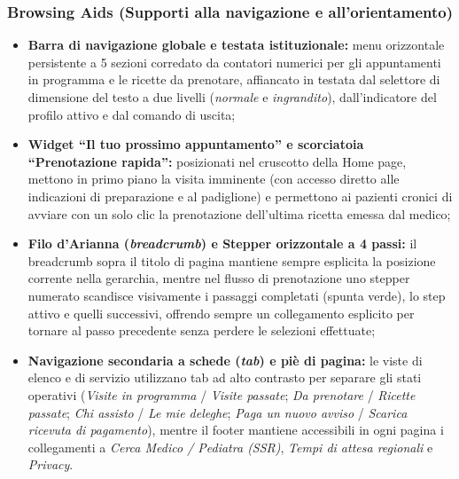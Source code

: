 \subsubsection{Browsing Aids (Supporti alla navigazione e all'orientamento)}
\begin{itemize}
\item \textbf{Barra di navigazione globale e testata istituzionale:} menu orizzontale persistente a 5 sezioni corredato da contatori numerici per gli appuntamenti in programma e le ricette da prenotare, affiancato in testata dal selettore di dimensione del testo a due livelli (\emph{normale} e \emph{ingrandito}), dall'indicatore del profilo attivo e dal comando di uscita;
\item \textbf{Widget ``Il tuo prossimo appuntamento'' e scorciatoia ``Prenotazione rapida'':} posizionati nel cruscotto della Home page, mettono in primo piano la visita imminente (con accesso diretto alle indicazioni di preparazione e al padiglione) e permettono ai pazienti cronici di avviare con un solo clic la prenotazione dell'ultima ricetta emessa dal medico;
\item \textbf{Filo d'Arianna (\emph{breadcrumb}) e Stepper orizzontale a 4 passi:} il breadcrumb sopra il titolo di pagina mantiene sempre esplicita la posizione corrente nella gerarchia, mentre nel flusso di prenotazione uno stepper numerato scandisce visivamente i passaggi completati (spunta verde), lo step attivo e quelli successivi, offrendo sempre un collegamento esplicito per tornare al passo precedente senza perdere le selezioni effettuate;
\item \textbf{Navigazione secondaria a schede (\emph{tab}) e piè di pagina:} le viste di elenco e di servizio utilizzano tab ad alto contrasto per separare gli stati operativi (\emph{Visite in programma} / \emph{Visite passate}; \emph{Da prenotare} / \emph{Ricette passate}; \emph{Chi assisto} / \emph{Le mie deleghe}; \emph{Paga un nuovo avviso} / \emph{Scarica ricevuta di pagamento}), mentre il footer mantiene accessibili in ogni pagina i collegamenti a \emph{Cerca Medico / Pediatra (SSR)}, \emph{Tempi di attesa regionali} e \emph{Privacy}.
\end{itemize}

